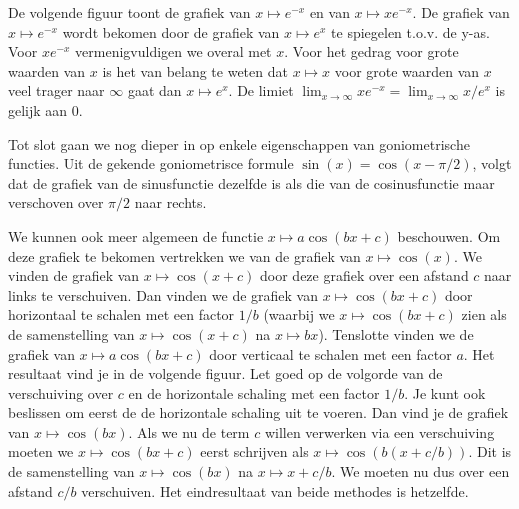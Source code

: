 \newpage

De volgende figuur toont de grafiek van $x\mapsto e^{-x}$ en van
$x\mapsto x e^{-x}$. De
grafiek van $x\mapsto e^{-x}$ wordt bekomen door de grafiek van
$x\mapsto e^x$ te
spiegelen t.o.v. de y-as. Voor $xe^{-x}$ vermenigvuldigen we
overal met $x$. Voor het gedrag voor grote waarden van $x$ is het van
belang te weten dat $x\mapsto x$ voor grote waarden van $x$ veel
trager naar $\infty$ gaat dan $x\mapsto e^{x}$. De limiet
$\lim_{x\rightarrow\infty} x e^{-x} = \lim_{x\rightarrow\infty} x/e^x$
is gelijk aan $0$.


\newpage

Tot slot gaan we nog dieper in op enkele eigenschappen van
goniometrische functies. Uit de gekende goniometrisce formule
$\sin(x)=\cos(x-\pi/2)$, volgt dat de grafiek van de sinusfunctie
dezelfde is als die van de cosinusfunctie maar verschoven over $\pi/2$
naar rechts.

We kunnen ook meer algemeen de functie $x\mapsto a \cos(b x + c)$
beschouwen. Om deze grafiek te bekomen vertrekken we van de grafiek
van $x\mapsto\cos(x)$. We vinden de grafiek van $x\mapsto\cos(x+c)$
door deze grafiek over een afstand $c$ naar links te verschuiven. Dan
vinden we de grafiek van $x\mapsto\cos(b x + c)$ door horizontaal te
schalen met een factor $1/b$ (waarbij we $x\mapsto\cos(bx+c)$ zien
als de samenstelling van $x\mapsto\cos(x+c)$ na $x\mapsto
bx$). Tenslotte vinden we de grafiek van $x\mapsto a\cos(bx+c)$ door
verticaal te schalen met een factor $a$. Het resultaat vind je in
de volgende figuur. Let goed op de volgorde van de verschuiving over
$c$ en de horizontale schaling met een factor $1/b$. Je kunt ook
beslissen om eerst de de horizontale schaling uit te voeren. Dan
vind je de grafiek van $x\mapsto\cos(bx)$. Als we nu de term $c$
willen verwerken via een verschuiving moeten we $x\mapsto\cos(bx+c)$
eerst schrijven als $x\mapsto\cos(b(x+c/b))$. Dit is de samenstelling
van $x\mapsto\cos(bx)$ na $x\mapsto x+c/b$. We moeten nu dus over
een afstand $c/b$ verschuiven. Het eindresultaat van beide methodes is
hetzelfde.


\newpage

